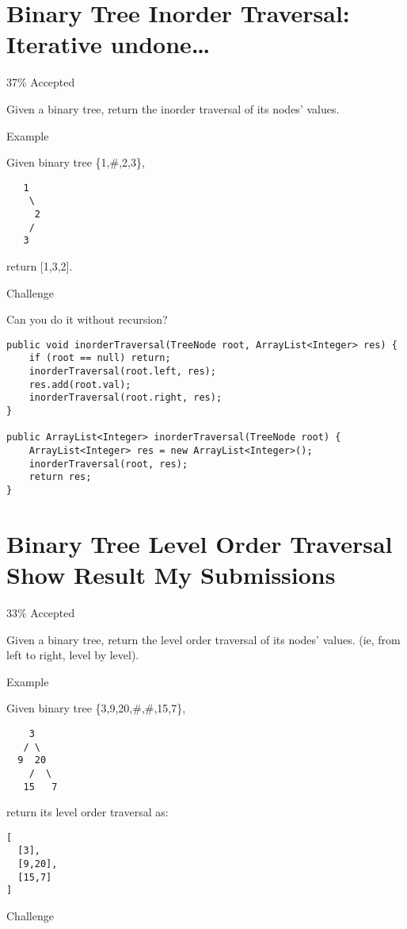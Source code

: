 \documentclass[9pt, b5paaper]{book}
\begin{document}
\section{Binary Tree Inorder Traversal: Iterative undone\ldots{}}
\label{sec-1-16}

37\% Accepted

Given a binary tree, return the inorder traversal of its nodes' values.

Example

Given binary tree \{1,\#,2,3\},
\begin{verbatim}
   1
    \
     2
    /
   3
\end{verbatim}

return [1,3,2].

Challenge

Can you do it without recursion?
\begin{verbatim}
public void inorderTraversal(TreeNode root, ArrayList<Integer> res) {
    if (root == null) return;
    inorderTraversal(root.left, res);
    res.add(root.val);
    inorderTraversal(root.right, res);
}
        
public ArrayList<Integer> inorderTraversal(TreeNode root) {
    ArrayList<Integer> res = new ArrayList<Integer>();
    inorderTraversal(root, res);
    return res;
}
\end{verbatim}
\section{Binary Tree Level Order Traversal Show Result My Submissions}
\label{sec-1-17}

33\% Accepted

Given a binary tree, return the level order traversal of its nodes' values. (ie, from left to right, level by level).

Example

Given binary tree \{3,9,20,\#,\#,15,7\},
\begin{verbatim}
    3
   / \
  9  20
    /  \
   15   7
\end{verbatim}

return its level order traversal as:
\begin{verbatim}
[
  [3],
  [9,20],
  [15,7]
]
\end{verbatim}

Challenge
\end{document}
